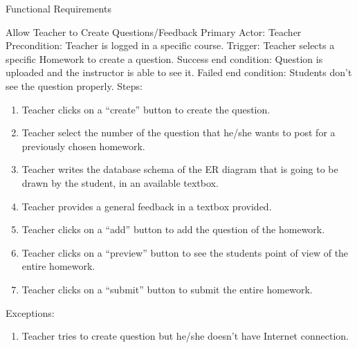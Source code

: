 \documentclass{article}
\begin{document}
\begin{section}{Functional Requirements}
\begin{subsection}{Allow Teacher to Create    Questions/Feedback}
    Primary Actor: Teacher \newline
    Precondition: Teacher is logged in a specific course. \newline
    Trigger: Teacher selects a specific Homework to create a     question. \newline
    Success end condition: Question is uploaded and the instructor is able to see it. \newline
    Failed end condition: Students don’t see the question       properly. \newline
    \newline
    Steps:
    \begin{enumerate}
    \item{Teacher clicks on a “create” button to create the           question.}
    \item{Teacher select the number of the question that             he/she wants to post for a previously chosen               homework.}
    \item{Teacher writes the database schema of the ER              diagram that is going to be drawn by the student, in         an available textbox.}
    \item{Teacher provides a general feedback in a textbox            provided.}
    \item{Teacher clicks on a “add” button to add the                 question of the homework.}
    \item{Teacher clicks on a “preview” button to see the           students point of view of the entire homework.}
    \item{Teacher clicks on a “submit” button to submit the           entire homework.}
    \end{enumerate}
    Exceptions:
    \begin{enumerate}
    \item{Teacher tries to create question but he/she doesn't have Internet connection.}
    \end{enumerate}
    \end{subsection}
    

\end{section}
\end{document}
